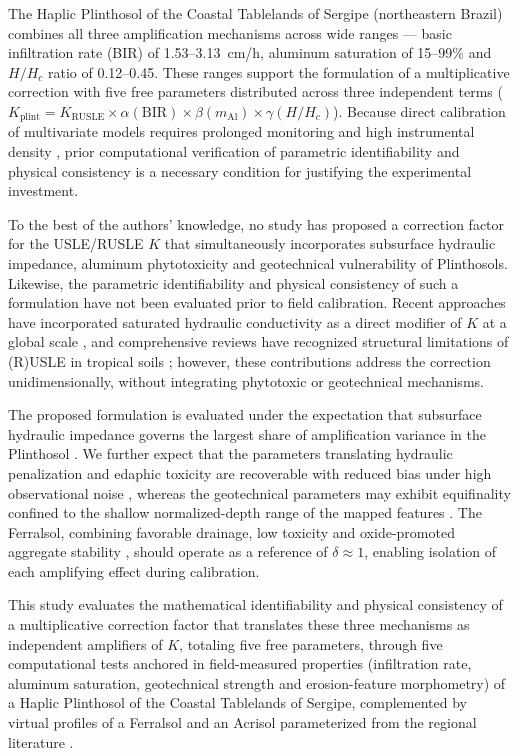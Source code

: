 \documentclass[pdflatex,sn-basic,referee,lineno]{sn-jnl}
\begin{document}
The Haplic Plinthosol of the Coastal Tablelands of Sergipe (northeastern Brazil) combines all three amplification mechanisms across wide ranges --- basic infiltration rate (BIR) of 1.53--3.13~cm/h, aluminum saturation of 15--99\% and $H/H_c$ ratio of 0.12--0.45. These ranges support the formulation of a multiplicative correction with five free parameters distributed across three independent terms ($K_{\mathrm{plint}} = K_{\mathrm{RUSLE}} \times \alpha(\mathrm{BIR}) \times \beta(m_{\mathrm{Al}}) \times \gamma(H/H_c)$). Because direct calibration of multivariate models requires prolonged monitoring and high instrumental density \citep{alewell_et_al_2019}, prior computational verification of parametric identifiability and physical consistency is a necessary condition for justifying the experimental investment.

To the best of the authors' knowledge, no study has proposed a correction factor for the USLE/RUSLE $K$ that simultaneously incorporates subsurface hydraulic impedance, aluminum phytotoxicity and geotechnical vulnerability of Plinthosols. Likewise, the parametric identifiability and physical consistency of such a formulation have not been evaluated prior to field calibration. Recent approaches have incorporated saturated hydraulic conductivity as a direct modifier of $K$ at a global scale \citep{gupta_et_al_2024}, and comprehensive reviews have recognized structural limitations of (R)USLE in tropical soils \citep{benavidez_et_al_2018}; however, these contributions address the correction unidimensionally, without integrating phytotoxic or geotechnical mechanisms.

The proposed formulation is evaluated under the expectation that subsurface hydraulic impedance governs the largest share of amplification variance in the Plinthosol \citep{gupta_et_al_2024}. We further expect that the parameters translating hydraulic penalization and edaphic toxicity are recoverable with reduced bias under high observational noise \citep{cheviron_et_al_2010,rao_et_al_2016}, whereas the geotechnical parameters may exhibit equifinality confined to the shallow normalized-depth range of the mapped features \citep{gudino_elizondo_et_al_2018}. The Ferralsol, combining favorable drainage, low toxicity and oxide-promoted aggregate stability \citep{barthes_roose_2002}, should operate as a reference of $\delta \approx 1$, enabling isolation of each amplifying effect during calibration.

This study evaluates the mathematical identifiability and physical consistency of a multiplicative correction factor that translates these three mechanisms as independent amplifiers of $K$, totaling five free parameters, through five computational tests anchored in field-measured properties (infiltration rate, aluminum saturation, geotechnical strength and erosion-feature morphometry) of a Haplic Plinthosol of the Coastal Tablelands of Sergipe, complemented by virtual profiles of a Ferralsol and an Acrisol parameterized from the regional literature \citep{silva_et_al_2009,bertoni_lombardi_neto_2017}.
\end{document}

